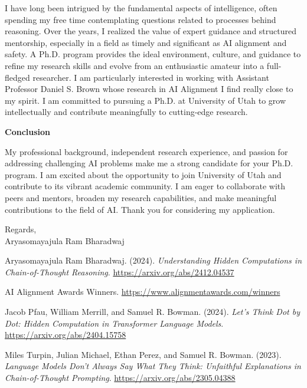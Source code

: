 \documentclass[12pt]{article}
\begin{document}
I have long been intrigued by the fundamental aspects of intelligence, often spending my free time contemplating questions related to  processes behind reasoning. Over the years, I realized the value of expert guidance and structured mentorship, especially in a field as timely and significant as AI alignment and safety. A Ph.D. program provides the ideal environment, culture, and guidance to refine my research skills and evolve from an enthusiastic amateur into a full-fledged researcher. I am particularly interested in working with Assistant Professor  Daniel S. Brown whose research in AI Alignment I find really close to my spirit. I am committed to pursuing a Ph.D. at University of Utah to grow intellectually and contribute meaningfully to cutting-edge research.

\textbf{Conclusion}

My professional background, independent research experience, and passion for addressing challenging AI problems make me a strong candidate for your Ph.D. program. I am excited about the opportunity to join University of Utah and contribute to its vibrant academic community. I am eager to collaborate with peers and mentors, broaden my research capabilities, and make meaningful contributions to the field of AI. Thank you for considering my application.

Regards,\\
Aryasomayajula Ram Bharadwaj

\newpage
\begin{thebibliography}{9}

Aryasomayajula Ram Bharadwaj. (2024). \emph{Understanding Hidden Computations in Chain-of-Thought Reasoning}.  
\url{https://arxiv.org/abs/2412.04537}

AI Alignment Awards Winners.  
\url{https://www.alignmentawards.com/winners}

Jacob Pfau, William Merrill, and Samuel R. Bowman. (2024). \emph{Let's Think Dot by Dot: Hidden Computation in Transformer Language Models}.  
\url{https://arxiv.org/abs/2404.15758}

Miles Turpin, Julian Michael, Ethan Perez, and Samuel R. Bowman. (2023). \emph{Language Models Don't Always Say What They Think: Unfaithful Explanations in Chain-of-Thought Prompting}.  
\url{https://arxiv.org/abs/2305.04388}

\end{thebibliography}
\end{document}
